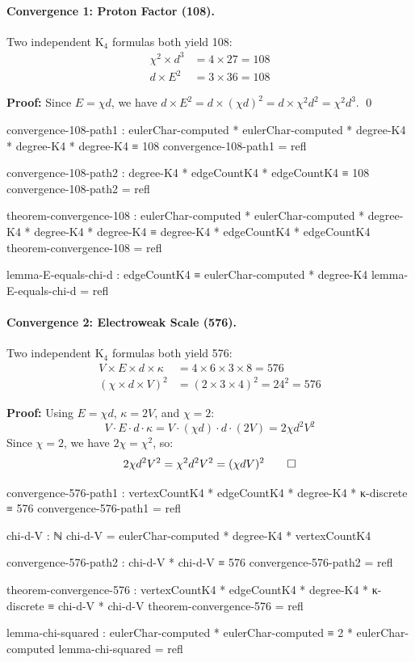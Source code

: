 \documentclass[11pt,a4paper]{book}
\begin{document}
\paragraph{Convergence 1: Proton Factor (108).}

Two independent K$_4$ formulas both yield 108:
\begin{align}
\chi^2 \times d^3 &= 4 \times 27 = 108 \\
d \times E^2 &= 3 \times 36 = 108
\end{align}

\textbf{Proof:} Since $E = \chi d$, we have $d \times E^2 = d \times (\chi d)^2 = d \times \chi^2 d^2 = \chi^2 d^3$. \qed

\begin{code}
convergence-108-path1 : eulerChar-computed * eulerChar-computed * degree-K4 * degree-K4 * degree-K4 ≡ 108
convergence-108-path1 = refl

convergence-108-path2 : degree-K4 * edgeCountK4 * edgeCountK4 ≡ 108
convergence-108-path2 = refl

theorem-convergence-108 : eulerChar-computed * eulerChar-computed * degree-K4 * degree-K4 * degree-K4 
                        ≡ degree-K4 * edgeCountK4 * edgeCountK4
theorem-convergence-108 = refl

lemma-E-equals-chi-d : edgeCountK4 ≡ eulerChar-computed * degree-K4
lemma-E-equals-chi-d = refl
\end{code}

\paragraph{Convergence 2: Electroweak Scale (576).}

Two independent K$_4$ formulas both yield 576:
\begin{align}
V \times E \times d \times \kappa &= 4 \times 6 \times 3 \times 8 = 576 \\
(\chi \times d \times V)^2 &= (2 \times 3 \times 4)^2 = 24^2 = 576
\end{align}

\textbf{Proof:} Using $E = \chi d$, $\kappa = 2V$, and $\chi = 2$:
\[
V \cdot E \cdot d \cdot \kappa = V \cdot (\chi d) \cdot d \cdot (2V) = 2\chi d^2 V^2
\]
Since $\chi = 2$, we have $2\chi = \chi^2$, so:
\[
2\chi d^2 V^2 = \chi^2 d^2 V^2 = (\chi d V)^2 \qed
\]

\begin{code}
convergence-576-path1 : vertexCountK4 * edgeCountK4 * degree-K4 * κ-discrete ≡ 576
convergence-576-path1 = refl

chi-d-V : ℕ
chi-d-V = eulerChar-computed * degree-K4 * vertexCountK4

convergence-576-path2 : chi-d-V * chi-d-V ≡ 576
convergence-576-path2 = refl

theorem-convergence-576 : vertexCountK4 * edgeCountK4 * degree-K4 * κ-discrete 
                        ≡ chi-d-V * chi-d-V
theorem-convergence-576 = refl

lemma-chi-squared : eulerChar-computed * eulerChar-computed ≡ 2 * eulerChar-computed
lemma-chi-squared = refl
\end{code}
\end{document}
